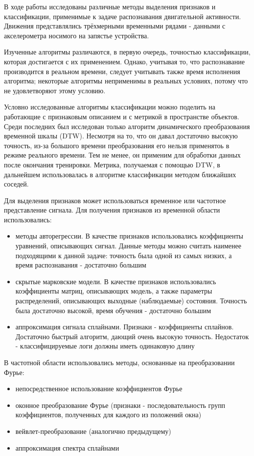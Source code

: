 \conclusion

В ходе работы исследованы различные методы выделения признаков и классификации, применимые к задаче распознавания двигательной активности. Движения представлялись трёхмерными временными рядами - данными с акселерометра носимого на запястье устройства.

Изученные алгоритмы различаются, в первую очередь, точностью классификации, которая достигается с их применением. Однако, учитывая то, что распознавание производится в реальном времени, следует учитывать также время исполнения алгоритма; некоторые алгоритмы неприменимы в реальных условиях, потому что не удовлетворяют этому условию.

Условно исследованные алгоритмы классификации можно поделить на работающие с признаковым описанием и с метрикой в пространстве объектов. Среди последних был исследован только алгоритм динамического преобразования временной шкалы (DTW). Несмотря на то, что он давал достаточно высокую точность, из-за большого времени преобразования его нельзя применятоь в режиме реального времени. Тем не менее, он применим для обработки данных после окончания тренировки. Метрика, получаемая с помощью DTW, в дальнейшем использовалась в алгоритме классификации методом ближайших соседей.

Для выделения признаков может использоваться временное или частотное представление сигнала. Для получения признаков из временной области использовались:
\begin{itemize}
\item методы авторегрессии. В качестве признаков использовались коэффициенты уравнений, описывающих сигнал. Данные методы можно считать наименее подходящими к данной задаче: точность была одной из самых низких, а время распознавания - достаточно большим
\item скрытые марковские модели. В качестве признаков использовались коэффициенты матриц, описывающих модель, а также параметры распределений, описывающих выходные (наблюдаемые) состояния. Точность была достаточно высокой, время обучения - достаточно большим
\item аппроксимация сигнала сплайнами. Признаки - коэффициенты сплайнов. Достаточно быстрый алгоритм, дающий очень высокую точность. Недостаток - классифицируемые логи должны иметь одинаковую длину
\end{itemize}

В частотной области использовались методы, основанные на преобразовании Фурье:
\begin{itemize}
\item непосредственное использование коэффициентов Фурье
\item оконное преобразование Фурье (признаки - последовательность групп коэффициентов, полученных для каждого из положений окна)
\item вейвлет-преобразование (аналогично предыдущему)
\item аппроксимация спектра сплайнами
\end{itemize}

